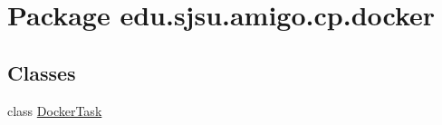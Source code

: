 \hypertarget{namespaceedu_1_1sjsu_1_1amigo_1_1cp_1_1docker}{}\section{Package edu.\+sjsu.\+amigo.\+cp.\+docker}
\label{namespaceedu_1_1sjsu_1_1amigo_1_1cp_1_1docker}
\subsection*{Classes}
\begin{DoxyCompactItemize}
\item 
class \hyperlink{classedu_1_1sjsu_1_1amigo_1_1cp_1_1docker_1_1_docker_task}{Docker\+Task}
\end{DoxyCompactItemize}
